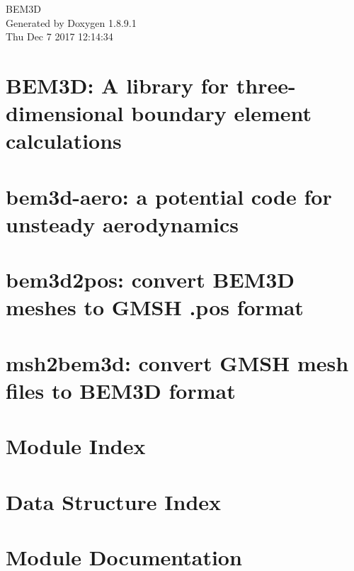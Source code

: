\documentclass[twoside]{book}
\newcommand{\+}{\discretionary{\mbox{\scriptsize$\hookleftarrow$}}{}{}}
\newcommand{\clearemptydoublepage}{%
  \newpage{\pagestyle{empty}\cleardoublepage}%
}
\begin{document}
\begin{titlepage}
\vspace*{7cm}
\begin{center}%
{\Large B\+E\+M3\+D }\\
\vspace*{1cm}
{\large Generated by Doxygen 1.8.9.1}\\
\vspace*{0.5cm}
{\small Thu Dec 7 2017 12:14:34}\\
\end{center}
\end{titlepage}
\clearemptydoublepage
\tableofcontents
\clearemptydoublepage
{}

\chapter{B\+E\+M3\+D\+: A library for three-\/dimensional boundary element calculations}
\label{index}
\chapter{bem3d-\/aero\+: a potential code for unsteady aerodynamics}
\label{bem3daero}

\chapter{bem3d2pos\+: convert B\+E\+M3\+D meshes to G\+M\+S\+H .pos format}
\label{bem3d2pos}

\chapter{msh2bem3d\+: convert G\+M\+S\+H mesh files to B\+E\+M3\+D format}
\label{msh2bem3d}

\chapter{Module Index}

\chapter{Data Structure Index}

\chapter{Module Documentation}






















\end{document}
